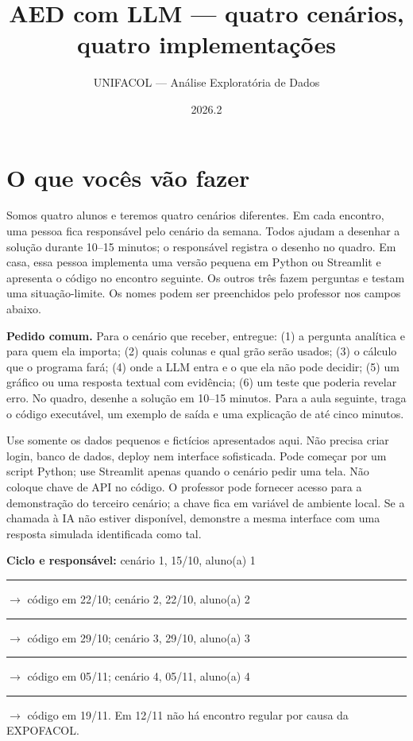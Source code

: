 \documentclass[10pt,a4paper]{article}
\title{AED com LLM --- quatro cenários, quatro implementações}
\author{UNIFACOL --- Análise Exploratória de Dados}
\date{2026.2}
\begin{document}
\maketitle

\section*{O que vocês vão fazer}
Somos quatro alunos e teremos quatro cenários diferentes. Em cada encontro, uma pessoa fica responsável pelo cenário da semana. Todos ajudam a desenhar a solução durante 10--15 minutos; o responsável registra o desenho no quadro. Em casa, essa pessoa implementa uma versão pequena em Python ou Streamlit e apresenta o código no encontro seguinte. Os outros três fazem perguntas e testam uma situação-limite. Os nomes podem ser preenchidos pelo professor nos campos abaixo.

\textbf{Pedido comum.} Para o cenário que receber, entregue: (1) a pergunta analítica e para quem ela importa; (2) quais colunas e qual grão serão usados; (3) o cálculo que o programa fará; (4) onde a LLM entra e o que ela não pode decidir; (5) um gráfico ou uma resposta textual com evidência; (6) um teste que poderia revelar erro. No quadro, desenhe a solução em 10--15 minutos. Para a aula seguinte, traga o código executável, um exemplo de saída e uma explicação de até cinco minutos.

Use somente os dados pequenos e fictícios apresentados aqui. Não precisa criar login, banco de dados, deploy nem interface sofisticada. Pode começar por um script Python; use Streamlit apenas quando o cenário pedir uma tela. Não coloque chave de API no código. O professor pode fornecer acesso para a demonstração do terceiro cenário; a chave fica em variável de ambiente local. Se a chamada à IA não estiver disponível, demonstre a mesma interface com uma resposta simulada identificada como tal.

\textbf{Ciclo e responsável:} cenário 1, 15/10, aluno(a) 1 \rule{3cm}{0.4pt} $\rightarrow$ código em 22/10; cenário 2, 22/10, aluno(a) 2 \rule{3cm}{0.4pt} $\rightarrow$ código em 29/10; cenário 3, 29/10, aluno(a) 3 \rule{3cm}{0.4pt} $\rightarrow$ código em 05/11; cenário 4, 05/11, aluno(a) 4 \rule{3cm}{0.4pt} $\rightarrow$ código em 19/11. Em 12/11 não há encontro regular por causa da EXPOFACOL.
\end{document}
